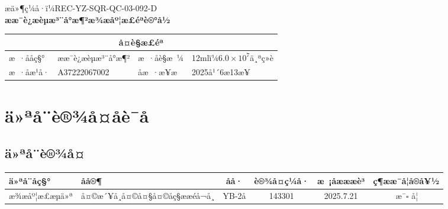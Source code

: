 \documentclass[UTF8,10pt,a4paper,fontset=fandol]{ctexart}
\newcommand{\fieldvalue}[1]{#1}
\newcommand{\handwritten}[1]{#1}
\begin{document}

\newpage

\begin{center}
æä»¶ç¼å·ï¼REC-YZ-SQR-QC-03-092-D\\[2pt]
\textbf{ææ¯è¿æèµæ³¨å°æ¶²æ¾æåº¦æ£éªè®°å½}
\end{center}

\begin{tabularx}{\textwidth}{|l|X|l|X|}
\hline
\multicolumn{4}{|c|}{å¤è§æ£éª}\\
\hline
æ ·ååç§° &
\fieldvalue{ææ¯è¿æèµæ³¨å°æ¶²} &
æ ·åè§æ ¼ &
\fieldvalue{12mlï¼$6.0\times10^7$ä¸ªç»è}\\
\hline
æ ·åæ¹å· &
\fieldvalue{\handwritten{A37222067002}} &
åæ ·æ¥æ &
\fieldvalue{\handwritten{2025å¹´6æ13æ¥}}\\
\hline
\end{tabularx}

\section{ä»ªå¨è®¾å¤åè¯å}

\subsection{ä»ªå¨è®¾å¤}

\begin{tabularx}{\textwidth}{|l|X|c|c|c|c|}
\hline
ä»ªå¨åç§° & åå®¶ & åå· & è®¾å¤ç¼å· & æ ¡åæææè³ & ç¶ææ¯å¦å®å¥½\\
\hline
æ¾æåº¦æ£æµä»ª &
\fieldvalue{å¤©æ´¥å¸å¤©å¤§å¤©åç§ææéå¬å¸} &
\fieldvalue{YB-2å} &
\fieldvalue{\handwritten{143301}} &
\fieldvalue{\handwritten{2025.7.21}} &
\fieldvalue{\handwritten{\checkmark}\,æ¯}\quad$\square$ å¦\\
\hline
    \end{tabularx}
\end{document}
